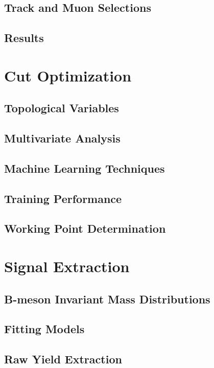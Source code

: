 \subsection{Track and Muon Selections}

\subsection{Results}

\section{Cut Optimization} 

\subsection{Topological Variables}

\subsection{Multivariate Analysis}

\subsection{Machine Learning Techniques}

\subsection{Training Performance}

\subsection{Working Point Determination}

\section{Signal Extraction} 

\subsection{B-meson Invariant Mass Distributions}

\subsection{Fitting Models}

\subsection{Raw Yield Extraction}

